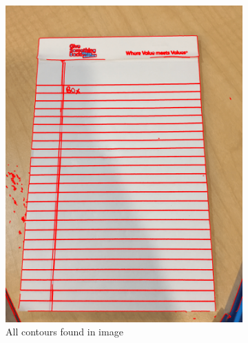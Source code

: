 \begin{figure}[H]
\begin{subfigure}[t]{0.3\textwidth}
         \includegraphics[width=\textwidth]{images/4_image/contours.png}
         \caption{All contours found in image}
         \label{fig:note_all}
     \end{subfigure}
     \hfill
     \begin{subfigure}[t]{0.3\textwidth}
         \centering

\end{subfigure}
\end{figure}
